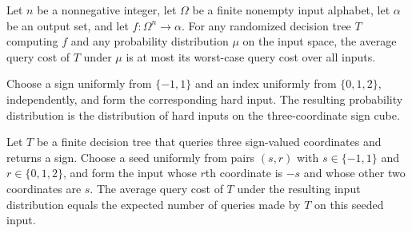 \begin{theorem}
\label{FABL.RandomizedDecisionTree.averageCostUnder_le_worstCaseCost}
\leanok
{}
Let $n$ be a nonnegative integer, let $\Omega$ be a finite nonempty input alphabet, let
$\alpha$ be an output set, and let $f:\Omega^n\to\alpha$. For any randomized
decision tree $T$ computing $f$ and any probability distribution $\mu$ on the input
space, the average query cost of $T$ under $\mu$ is at most its worst-case query cost
over all inputs.
\end{theorem}

\begin{definition}
\label{FABL.majorityThreeHardPMF}
\leanok
{}
Choose a sign uniformly from $\{-1,1\}$ and an index uniformly from $\{0,1,2\}$,
independently, and form the corresponding hard input. The resulting probability
distribution is the distribution of hard inputs on the three-coordinate sign cube.
\end{definition}

\begin{theorem}
\label{FABL.deterministicAverageCostUnder_majorityThreeHardPMF}
\leanok
{}
Let $T$ be a finite decision tree that queries three sign-valued coordinates and returns
a sign. Choose a seed uniformly from pairs $(s,r)$ with $s\in\{-1,1\}$ and
$r\in\{0,1,2\}$, and form the input whose $r$th coordinate is $-s$ and whose other two
coordinates are $s$. The average query cost of $T$ under the resulting input
distribution equals the expected number of queries made by $T$ on this seeded input.
\end{theorem}


